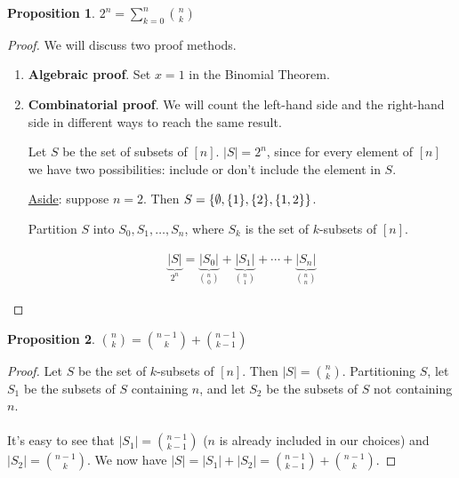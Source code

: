 \documentclass[]{article}
\newtheorem*{proposition}{Proposition}
\theoremstyle{definition}
\DeclarePairedDelimiter{\set}{\lbrace}{\rbrace}
\begin{document}
				\begin{proposition}
					$\displaystyle 2^n = \sum_{k = 0}^{n} \binom{n}{k}$
				\end{proposition}

				\begin{proof}
					We will discuss two proof methods.

					\begin{enumerate}
						\item \textbf{Algebraic proof}. Set $x = 1$ in the Binomial Theorem.
						\item \textbf{Combinatorial proof}. We will count the left-hand side and the right-hand side in different ways to reach the same result.

						Let $S$ be the set of subsets of $[n]$. $|S| = 2^n$, since for every element of $[n]$ we have two possibilities: include or don't include the element in $S$.

						\underline{Aside}: suppose $n = 2$. Then $S = \set{\emptyset, \set{1}, \set{2}, \set{1, 2}}$.

						Partition $S$ into $S_0, S_1, \ldots, S_n$, where $S_k$ is the set of $k$-subsets of $[n]$.

						\begin{align*}
							\underbrace{|S|}_{2^n} = \underbrace{|S_0|}_{\binom{n}{0}} + \underbrace{|S_1|}_{\binom{n}{1}} + \cdots + \underbrace{|S_n|}_{\binom{n}{n}}
						\end{align*}
						\qedhere
					\end{enumerate}
				\end{proof}

				\begin{proposition}
					$\displaystyle \binom{n}{k} = \binom{n - 1}{k} + \binom{n - 1}{k - 1}$
				\end{proposition}

				\begin{proof}
					Let $S$ be the set of $k$-subsets of $[n]$. Then $|S| = \binom{n}{k}$. Partitioning $S$, let $S_1$ be the subsets of $S$ containing $n$, and let $S_2$ be the subsets of $S$ not containing $n$.
					\\ \\
					It's easy to see that $|S_1| = \binom{n - 1}{k - 1}$ ($n$ is already included in our choices) and $|S_2| = \binom{n - 1}{k}$. We now have $|S| = |S_1| + |S_2| = \binom{n - 1}{k - 1} + \binom{n - 1}{k}$.
				\end{proof}
\end{document}
